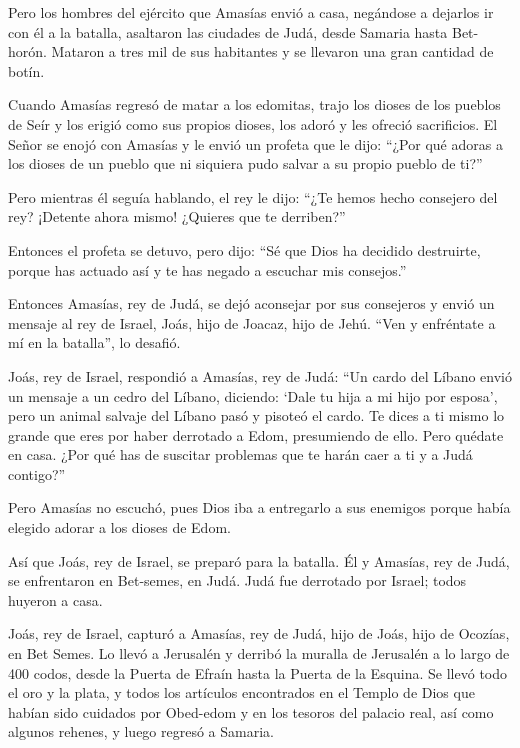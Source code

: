  Pero los hombres del ejército que Amasías envió a casa,
negándose a dejarlos ir con él a la batalla, asaltaron las ciudades de
Judá, desde Samaria hasta Bet-horón. Mataron a tres mil de sus
habitantes y se llevaron una gran cantidad de botín.

 Cuando Amasías regresó de matar a los edomitas, trajo los
dioses de los pueblos de Seír y los erigió como sus propios dioses, los
adoró y les ofreció sacrificios.  El Señor se enojó con
Amasías y le envió un profeta que le dijo: ``¿Por qué adoras a los
dioses de un pueblo que ni siquiera pudo salvar a su propio pueblo de
ti?''

 Pero mientras él seguía hablando, el rey le dijo: ``¿Te
hemos hecho consejero del rey? ¡Detente ahora mismo! ¿Quieres que te
derriben?''

Entonces el profeta se detuvo, pero dijo: ``Sé que Dios ha decidido
destruirte, porque has actuado así y te has negado a escuchar mis
consejos.''

 Entonces Amasías, rey de Judá, se dejó aconsejar por sus
consejeros y envió un mensaje al rey de Israel, Joás, hijo de Joacaz,
hijo de Jehú. ``Ven y enfréntate a mí en la batalla'', lo desafió.

 Joás, rey de Israel, respondió a Amasías, rey de Judá:
``Un cardo del Líbano envió un mensaje a un cedro del Líbano, diciendo:
`Dale tu hija a mi hijo por esposa', pero un animal salvaje del Líbano
pasó y pisoteó el cardo.  Te dices a ti mismo lo grande que
eres por haber derrotado a Edom, presumiendo de ello. Pero quédate en
casa. ¿Por qué has de suscitar problemas que te harán caer a ti y a Judá
contigo?''

 Pero Amasías no escuchó, pues Dios iba a entregarlo a sus
enemigos porque había elegido adorar a los dioses de Edom.

 Así que Joás, rey de Israel, se preparó para la batalla.
Él y Amasías, rey de Judá, se enfrentaron en Bet-semes, en Judá.
 Judá fue derrotado por Israel; todos huyeron a casa.

 Joás, rey de Israel, capturó a Amasías, rey de Judá, hijo
de Joás, hijo de Ocozías, en Bet Semes. Lo llevó a Jerusalén y derribó
la muralla de Jerusalén a lo largo de 400 codos, desde la Puerta de
Efraín hasta la Puerta de la Esquina.  Se llevó todo el oro
y la plata, y todos los artículos encontrados en el Templo de Dios que
habían sido cuidados por Obed-edom y en los tesoros del palacio real,
así como algunos rehenes, y luego regresó a Samaria.

